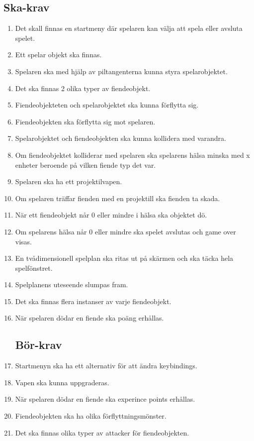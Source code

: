 \documentclass{TDP005mall}
\begin{document}
\subsection{Ska-krav}
\begin{enumerate}
\item Det skall finnas en startmeny där spelaren kan välja att spela eller avsluta spelet.
\item Ett spelar objekt ska finnas.
\item Spelaren ska med hjälp av piltangenterna kunna styra spelarobjektet.
\item Det ska finnas 2 olika typer av fiendeobjekt.
\item Fiendeobjekteten och spelarobjektet ska kunna förflytta sig.
\item Fiendeobjekten ska förflytta sig mot spelaren.
\item Spelarobjektet och fiendeobjekten ska kunna kollidera med varandra.
\item Om fiendeobjektet kolliderar med spelaren ska spelarens hälsa minska med x enheter beroende på vilken fiende typ det var.
\item Spelaren ska ha ett projektilvapen.
\item Om spelaren träffar fienden med en projektill ska fienden ta skada.
\item När ett fiendeobjekt når 0 eller mindre i hälsa ska objektet dö.
\item Om spelarens hälsa når 0 eller mindre ska spelet avslutas och game over visas.
\item En tvådimensionell spelplan ska ritas ut på skärmen och ska täcka hela spelfönstret.
\item Spelplanens uteseende slumpas fram.
\item Det ska finnas flera instanser av varje fiendeobjekt.
\item När spelaren dödar en fiende ska poäng erhållas.

\subsection{Bör-krav}

\item Startmenyn ska ha ett alternativ för att ändra keybindings.
\item Vapen ska kunna uppgraderas.
\item När spelaren dödar en fiende ska experince points erhållas.
\item Fiendeobjekten ska ha olika förflyttningsmönster.
\item Det ska finnas olika typer av attacker för fiendeobjekten.
\end{enumerate}
\end{document}
